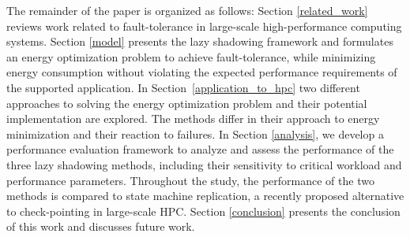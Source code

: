 The remainder of the paper is organized as follows: Section
\ref{related_work} reviews work related to fault-tolerance in
large-scale high-performance computing systems. Section
\ref{model} presents the lazy shadowing framework and formulates an energy optimization problem
to achieve fault-tolerance, while minimizing energy consumption
without violating the expected performance requirements of the
supported application. In Section~\ref{application_to_hpc} two different approaches to
solving the energy optimization problem and their potential
implementation are explored. The methods differ in their approach to
energy minimization and their reaction to failures. In Section
\ref{analysis}, we develop a performance evaluation framework to
analyze and assess the performance of the three lazy shadowing
methods, including their sensitivity to critical workload and
performance parameters.  Throughout the study, the performance of the
two methods is compared to state machine replication, a recently proposed
alternative to check-pointing in large-scale HPC.  Section
\ref{conclusion} presents the conclusion of this work and discusses
future work.